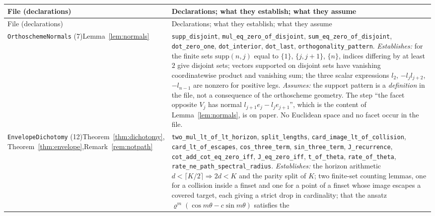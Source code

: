 \documentclass[11pt,a4paper]{article}
\theoremstyle{definition}
\theoremstyle{remark}
\theoremstyle{plain}
\begin{document}
\footnotesize
\renewcommand{\arraystretch}{1.2}
\begin{longtable}{@{}p{}p{}@{}}
\toprule
File (declarations) & Declarations; what they establish; what they assume \\
\midrule
\endfirsthead
\toprule
File (declarations) & Declarations; what they establish; what they assume \\
\midrule
\endhead
\texttt{OrthoschemeNormals} (7)\newline Lemma~\ref{lem:normals}
& \texttt{supp\_disjoint}, \texttt{mul\_eq\_zero\_of\_disjoint},
  \texttt{sum\_eq\_zero\_of\_disjoint}, \texttt{dot\_zero\_one}, \texttt{dot\_interior},
  \texttt{dot\_last}, \texttt{orthogonality\_pattern}.\newline
  \emph{Establishes:} for the finite sets $\mathrm{supp}(n,j)$ equal to $\{1\}$, $\{j,j+1\}$,
  $\{n\}$, indices differing by at least $2$ give disjoint sets; vectors supported on disjoint
  sets have vanishing coordinatewise product and vanishing sum; the three scalar expressions
  $l_2$, $-l_jl_{j+2}$, $-l_{n-1}$ are nonzero for positive legs.\newline
  \emph{Assumes:} the support pattern is a \emph{definition} in the file, not a consequence of
  the orthoscheme geometry. The step ``the facet opposite $V_j$ has normal
  $l_{j+1}e_j-l_je_{j+1}$'', which is the content of Lemma~\ref{lem:normals}, is on paper.
  No Euclidean space and no facet occur in the file. \\
\addlinespace
\texttt{EnvelopeDichotomy} (12)\newline Theorem~\ref{thm:dichotomy},\newline
Theorem~\ref{thm:envelope},\newline Remark~\ref{rem:notpath}
& \texttt{two\_mul\_lt\_of\_lt\_horizon}, \texttt{split\_lengths},
  \texttt{card\_image\_lt\_of\_collision}, \texttt{card\_lt\_of\_escapes},
  \texttt{cos\_three\_term}, \texttt{sin\_three\_term}, \texttt{J\_recurrence},
  \texttt{cot\_add\_cot\_eq\_zero\_iff}, \texttt{J\_eq\_zero\_iff}, \texttt{t\_of\_theta},
  \texttt{rate\_of\_theta}, \texttt{rate\_ne\_path\_spectral\_radius}.\newline
  \emph{Establishes:} the horizon arithmetic $d<\lceil K/2\rceil\Rightarrow2d<K$ and the
  parity split of $K$; two finite-set counting lemmas, one for a collision inside a finset and
  one for a point of a finset whose image escapes a covered target, each giving a strict drop
  in cardinality; that the ansatz $\varrho^m(\cos m\theta-c\sin m\theta)$ satisfies the

\end{longtable}
\end{document}
